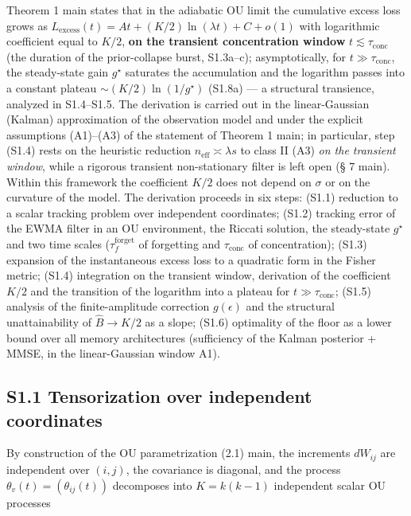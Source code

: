 \documentclass[12pt]{iopart}
\begin{document}
Theorem 1 main states that in the adiabatic OU limit the cumulative excess loss grows as \(L_{\text{excess}}(t) = A t + (K/2)\ln(\lambda t) + C + o(1)\) with logarithmic coefficient equal to \(K/2\), \textbf{on the transient concentration window} \(t \lesssim \tau_{\text{conc}}\) (the duration of the prior-collapse burst, S1.3a--c); asymptotically, for \(t \gg \tau_{\text{conc}}\), the steady-state gain \(g^\star\) saturates the accumulation and the logarithm passes into a constant plateau \(\sim(K/2)\ln(1/g^\star)\) (S1.8a) --- a structural transience, analyzed in S1.4--S1.5. The derivation is carried out in the linear-Gaussian (Kalman) approximation of the observation model and under the explicit assumptions (A1)--(A3) of the statement of Theorem 1 main; in particular, step (S1.4) rests on the heuristic reduction \(n_{\text{eff}} \asymp \lambda s\) to class II (A3) \emph{on the transient window}, while a rigorous transient non-stationary filter is left open (§ 7 main). Within this framework the coefficient \(K/2\) does not depend on \(\sigma\) or on the curvature of the model. The derivation proceeds in six steps: (S1.1) reduction to a scalar tracking problem over independent coordinates; (S1.2) tracking error of the EWMA filter in an OU environment, the Riccati solution, the steady-state \(g^\star\) and two time scales (\(\tau_f^{\text{forget}}\) of forgetting and \(\tau_{\text{conc}}\) of concentration); (S1.3) expansion of the instantaneous excess loss to a quadratic form in the Fisher metric; (S1.4) integration on the transient window, derivation of the coefficient \(K/2\) and the transition of the logarithm into a plateau for \(t \gg \tau_{\text{conc}}\); (S1.5) analysis of the finite-amplitude correction \(g(\epsilon)\) and the structural unattainability of \(\hat B \to K/2\) as a slope; (S1.6) optimality of the floor as a lower bound over all memory architectures (sufficiency of the Kalman posterior + MMSE, in the linear-Gaussian window A1).



\subsection{S1.1 Tensorization over independent coordinates}\label{s1.1-tensorization-over-independent-coordinates}



By construction of the OU parametrization (2.1) main, the increments \(dW_{ij}\) are independent over \((i,j)\), the covariance is diagonal, and the process \(\theta_v(t) = (\theta_{ij}(t))\) decomposes into \(K = k(k-1)\) independent scalar OU processes
\end{document}
